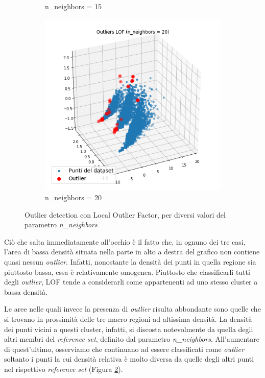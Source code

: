 \documentclass[a4paper]{article}
\begin{document}
\begin{figure}[h]
\begin{subfigure}[b]{.32\linewidth}
\caption{n\_neighbors = 15}
\label{subfig:lof2}
\end{subfigure}
\begin{subfigure}[b]{.32\linewidth}
\includegraphics[width=\linewidth]{images/LOF_20.png}
\caption{n\_neighbors = 20}
\label{subfig:lof3}
\end{subfigure}
\caption{Outlier detection con Local Outlier Factor, per diversi valori del parametro \textit{n\_neighbors}}
\label{fig:lofs}
\end{figure}

\noindent
Ciò che salta immediatamente all'occhio è il fatto che, in ognuno dei tre casi, l'area di bassa densità situata nella parte in alto a destra del grafico non contiene quasi nessun \textit{outlier}. Infatti, nonostante la densità dei punti in quella regione sia piuttosto bassa, essa è relativamente omogenea. Piuttosto che classificarli tutti degli \textit{outlier}, LOF tende a considerarli come appartenenti ad uno stesso cluster a bassa densità.

Le aree nelle quali invece la presenza di \textit{outlier} risulta abbondante sono quelle che si trovano in prossimità  delle tre macro regioni ad altissima densità. La densità dei punti vicini a questi cluster, infatti, si discosta notevolmente da quella degli altri membri del \textit{reference set}, definito dal parametro \textit{n\_neighbors}. All'aumentare di quest'ultimo, osserviamo che continuano ad essere classificati come \textit{outlier} soltanto i punti la cui densità relativa è molto diversa da quelle degli altri punti nel rispettivo \textit{reference set} (Figura \ref{subfig:lof3}).
\end{document}
